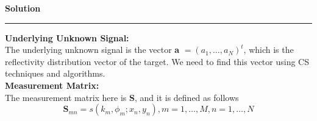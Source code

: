 \documentclass[a4paper,12pt]{article}
\newenvironment{solution}[2][]{%
    \begin{mdframed}[linecolor=blue!70!black, linewidth=2pt, roundcorner=10pt, backgroundcolor=yellow!10!white, skipabove=12pt, skipbelow=12pt]%
        \textbf{\large #2}
        \par\noindent\rule{\textwidth}{0.4pt}
}{
    \end{mdframed}
}
\begin{document}
\begin{solution}{Solution}
\hspace{-19pt}\textbf{Underlying Unknown Signal: }\\
The underlying unknown signal is the vector \textbf{a} $= (a_1,\dots,a_N)^t$, which is the reflectivity distribution vector of the target. We need to find this vector using CS techniques and algorithms. \\

\hspace{-19pt}\textbf{Measurement Matrix: }\\
The measurement matrix here is \textbf{S}, and it is defined as follows
\[
\textbf{S}_{mn} = s(k_m,\phi_m;x_n,y_n), m = 1,\dots,M, n = 1,\dots,N
\]
\end{solution}
\end{document}
